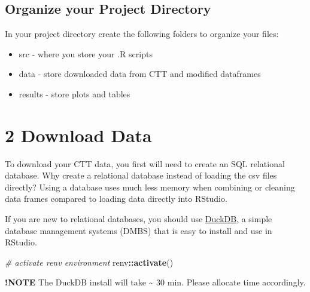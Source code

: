 \documentclass[
]{book}
\newenvironment{Shaded}{\begin{snugshade}}{\end{snugshade}}
\newcommand{\CommentTok}[1]{\textcolor[rgb]{0.56,0.35,0.01}{\textit{#1}}}
\newcommand{\FunctionTok}[1]{\textcolor[rgb]{0.13,0.29,0.53}{\textbf{#1}}}
\newcommand{\NormalTok}[1]{#1}
\newcommand{\SpecialCharTok}[1]{\textcolor[rgb]{0.81,0.36,0.00}{\textbf{#1}}}
\providecommand{\tightlist}{%
  \setlength{\itemsep}{0pt}\setlength{\parskip}{0pt}}
\begin{document}
\section{Organize your Project Directory}\label{organize-your-project-directory}

In your project directory create the following folders to organize your files:

\begin{itemize}
\tightlist
\item
  src - where you store your .R scripts
\item
  data - store downloaded data from CTT and modified dataframes
\item
  results - store plots and tables
\end{itemize}

\chapter{2 Download Data}\label{download-data}

To download your CTT data, you first will need to create an SQL relational database. Why create a relational database instead of loading the csv files directly? Using a database uses much less memory when combining or cleaning data frames compared to loading data directly into RStudio.

If you are new to relational databases, you should use \href{https://duckdb.org/why_duckdb}{DuckDB}, a simple database management systems (DMBS) that is easy to install and use in RStudio.

\begin{Shaded}
\begin{Highlighting}[]
\CommentTok{\# activate renv environment}
\NormalTok{renv}\SpecialCharTok{::}\FunctionTok{activate}\NormalTok{()}
\end{Highlighting}
\end{Shaded}

\textbf{!NOTE} The DuckDB install will take \textasciitilde{} 30 min. Please allocate time accordingly.
\end{document}
